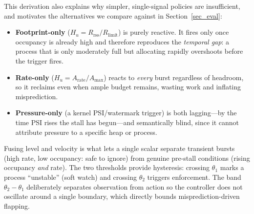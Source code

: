 This derivation also explains why simpler, single-signal policies are insufficient, and motivates the alternatives we compare against in Section~\ref{sec_eval}:
\begin{itemize}
  \item \textbf{Footprint-only} ($H_u=R_{\mathrm{rss}}/R_{\mathrm{limit}}$) is purely reactive. It fires only once occupancy is already high and therefore reproduces the \emph{temporal gap}: a process that is only moderately full but allocating rapidly overshoots before the trigger fires.
  \item \textbf{Rate-only} ($H_u=A_{\mathrm{rate}}/A_{\mathrm{max}}$) reacts to \emph{every} burst regardless of headroom, so it reclaims even when ample budget remains, wasting work and inflating misprediction.
  \item \textbf{Pressure-only} (a kernel PSI/watermark trigger) is both lagging---by the time PSI rises the stall has begun---and semantically blind, since it cannot attribute pressure to a specific heap or process.
\end{itemize}
Fusing level and velocity is what lets a single scalar separate transient bursts (high rate, low occupancy: safe to ignore) from genuine pre-stall conditions (rising occupancy \emph{and} rate). The two thresholds provide hysteresis: crossing $\theta_1$ marks a process ``unstable'' (soft watch) and crossing $\theta_2$ triggers enforcement. The band $\theta_2-\theta_1$ deliberately separates observation from action so the controller does not oscillate around a single boundary, which directly bounds misprediction-driven flapping.


